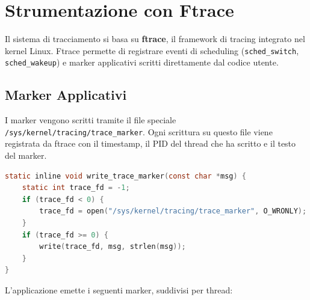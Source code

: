 \section{Strumentazione con Ftrace}
\label{sec:ftrace}

Il sistema di tracciamento si basa su \textbf{ftrace}, il framework di
tracing integrato nel kernel Linux. Ftrace permette di registrare eventi
di scheduling (\texttt{sched\_switch}, \texttt{sched\_wakeup}) e marker
applicativi scritti direttamente dal codice utente.

\subsection{Marker Applicativi}
\label{subsec:marker}

I marker vengono scritti tramite il file speciale
\texttt{/sys/kernel/tracing/trace\_marker}. Ogni scrittura su questo file
viene registrata da ftrace con il timestamp, il PID del thread che ha
scritto e il testo del marker.

\begin{lstlisting}[language=C, caption={Funzione per scrivere marker ftrace.}, label={lst:write_marker}]
static inline void write_trace_marker(const char *msg) {
    static int trace_fd = -1;
    if (trace_fd < 0) {
        trace_fd = open("/sys/kernel/tracing/trace_marker", O_WRONLY);
    }
    if (trace_fd >= 0) {
        write(trace_fd, msg, strlen(msg));
    }
}
\end{lstlisting}

L'applicazione emette i seguenti marker, suddivisi per thread:

